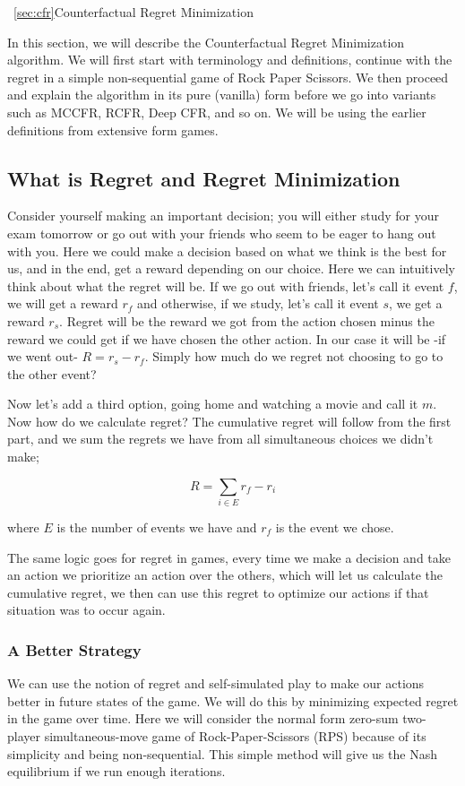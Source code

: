 \Section~\ref{sec:cfr}{Counterfactual Regret Minimization}

In this section, we will describe the Counterfactual Regret Minimization algorithm.
We will first start with terminology and definitions, continue with the regret in a simple non-sequential game of Rock Paper Scissors. We then proceed and explain
the algorithm in its pure (vanilla) form before we go into variants such as 
MCCFR, RCFR, Deep CFR, and so on. We will be using the earlier definitions from
extensive form games.

\subsection{What is Regret and Regret Minimization} %
\label{sub:regret}
Consider yourself making an important decision; you will either study for your exam tomorrow
or go out with your friends who seem to be eager to hang out with you. Here
we could make a decision based on what we think is the best for us, and in the end, 
get a reward depending on our choice. Here we can intuitively think about what the regret will be. If we go out with friends, let's call it event $f$, we will get a reward $r_f$
and otherwise, if we study, let's call it event $s$, we get a reward $r_s$. Regret
will be the reward we got from the action chosen minus the reward we could get if we
have chosen the other action. In our case it will be -if we went out- $R = r_s - r_f$.
Simply how much do we regret not choosing to go to the other event? 

Now let's add a third option, going home and watching a movie and call it $m$.
Now how do we calculate regret? The cumulative regret will follow from the first
part, and we sum the regrets we have from all simultaneous choices we 
didn't make;

$$R= \sum_{i\in E}{r_f-r_i}$$

where $E$ is the number of events we have and $r_f$ is the event we chose. 

The same logic goes for regret in games, every time we make a decision and take an action
we prioritize an action over the others, which will let us calculate the cumulative regret,
we then can use this regret to optimize our actions if that situation was to occur again.

\subsubsection{A Better Strategy} %
\label{ssub:betterStrategy}
We can use the notion of regret and self-simulated play to make our actions better in future states
of the game. We will do this by minimizing expected regret in the game over time.
Here we will consider the normal form zero-sum two-player simultaneous-move game of Rock-Paper-Scissors (RPS)
because of its simplicity and being non-sequential. This simple method will give us the 
Nash equilibrium if we run enough iterations.

